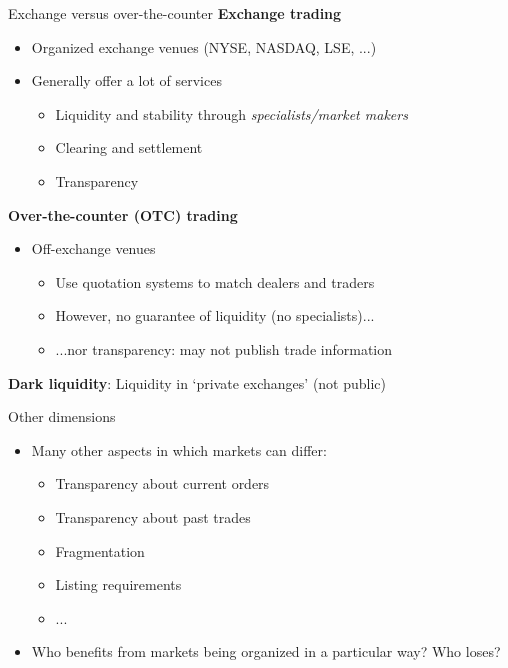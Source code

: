 \documentclass[english,10pt
,aspectratio=169
]{beamer}
\begin{document}
\begin{frame}{Exchange versus over-the-counter}
\textbf{Exchange trading}
\begin{itemize}
	\item Organized exchange venues (NYSE, NASDAQ, LSE, ...)
	\item Generally offer a lot of services
	\begin{itemize}
		\item Liquidity and stability through \textit{specialists/market makers}
		\item Clearing and settlement
		\item Transparency
	\end{itemize}
\end{itemize}
\textbf{Over-the-counter (OTC) trading}
\begin{itemize}
	\item Off-exchange venues
	\begin{itemize}
		\item Use quotation systems to match dealers and traders
		\item However, no guarantee of liquidity (no specialists)...
		\item ...nor transparency: may not publish trade information
	\end{itemize}
\end{itemize}
\textbf{Dark liquidity}: Liquidity in `private exchanges' (not public)
\end{frame}


\begin{frame}{Other dimensions}
	\begin{itemize}
		\item Many other aspects in which markets can differ:
		\begin{itemize}
			\item Transparency about current orders
			\item Transparency about past trades
			\item Fragmentation
			\item Listing requirements
			\item ...
		\end{itemize}
		\item Who benefits from markets being organized in a particular way? Who loses? 
	\end{itemize}
\end{frame}
\end{document}
